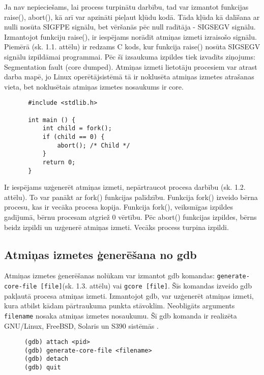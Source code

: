 Ja nav nepieciešams, lai process turpinātu darbību, tad var izmantot funkcijas raise(), abort(), kā arī var apzināti pieļaut kļūdu kodā.
Tāda kļūda kā dalīšana ar nulli nosūta SIGFPE signālu, bet vēršanās pēc null radītāja - SIGSEGV signālu.
Izmantojot funkciju raise(), ir iespējams norādīt atmiņas izmeti izraisošo signālu.
Piemērā (sk. 1.1. attēlu) ir redzams C kods, kur funkcija raise() nosūta SIGSEGV signālu izpildāmai programmai. 
Pēc šī izsaukuma izpildes tiek izvadīts ziņojums: Segmentation fault (core dumped).
Atmiņas izmeti lietotāju procesiem var atrast darba mapē, jo Linux operētājsistēmā tā ir noklusēta atmiņas izmetes atrašanas vieta, bet noklusētais atmiņas izmetes nosaukums ir core.
\begin{figure}[h]
\begin{lstlisting}
 #include <stdlib.h>

 int main () {
     int child = fork();
     if (child == 0) {
         abort(); /* Child */
     }
     return 0;
 }
 \end{lstlisting}
\caption{\textbf{\fontsize{11}{12}\selectfont {Atmiņas izmetes ģenerēšana, turpinot procesa darbību}}}
\end{figure}

Ir iespējams uzģenerēt atmiņas izmeti, nepārtraucot procesa darbību (sk. 1.2. attēlu). 
To var panākt ar fork() funkcijas palīdzību. Funkcija fork() izveido bērna procesu, kas ir vecāka procesa kopija.
Funkcija fork(), veiksmīgas izpildes gadījumā, bērnu procesam atgriež 0 vērtību. 
Pēc abort() funkcijas izpildes, bērns beidz izpildi un uzģenerē atmiņas izmeti. Vecāks process turpina izpildi.

\subsection{Atmiņas izmetes ģenerēšana no gdb}

Atmiņas izmetes ģenerēšanas nolūkam var izmantot gdb komandas: \texttt{generate-core-file [file]}(sk. 1.3. attēlu) vai \texttt{gcore [file]}. Šīs komandas izveido gdb pakļautā procesa atmiņas izmeti. 
Izmantojot gdb, var uzģenerēt atmiņas izmeti, kura atbilst kādam pārtraukuma punkta stāvoklim. 
Neobligāts arguments \texttt{filename} nosaka atmiņas izmetes nosaukumu. Šī gdb komanda ir realizēta GNU/Linux, FreeBSD, Solaris un S390 sistēmās \cite {gdb_gen_core}.
\begin{figure}[h]
\begin{lstlisting}[style=customgdb]
(gdb) attach <pid>
(gdb) generate-core-file <filename>
(gdb) detach
(gdb) quit
 \end{lstlisting}
\caption{\textbf{\fontsize{11}{12}\selectfont {Atmiņas izmetes ģenerēšana, izmantojot gdb}}}
\end{figure}

